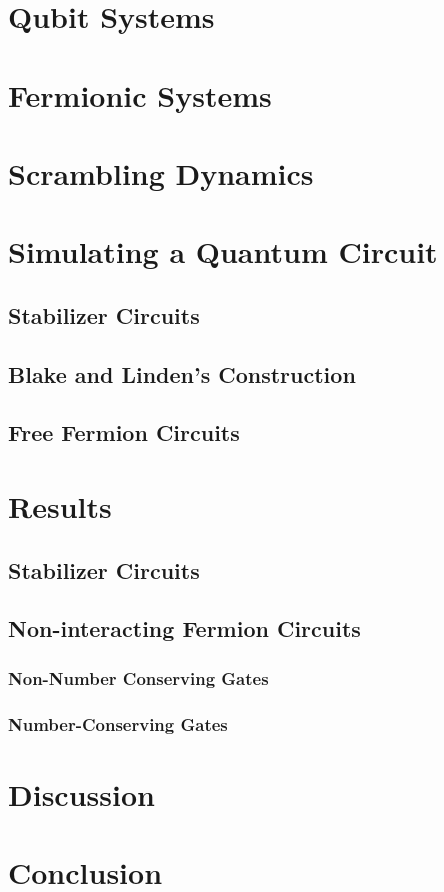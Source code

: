 \documentclass[ aps]{revtex4-2}
\begin{document}




\cleardoublepage





\section{Qubit Systems}




\section{Fermionic Systems}

\section{Scrambling Dynamics}

% 

\newpage
\section{Simulating a Quantum Circuit}
\subsection{Stabilizer Circuits}
\subsection{Blake and Linden's Construction}
\subsection{Free Fermion Circuits}

\section{Results}
\subsection{Stabilizer Circuits}
\subsection{Non-interacting Fermion Circuits}
\subsubsection{Non-Number Conserving Gates}
\subsubsection{Number-Conserving Gates}

\section{Discussion}

\section{Conclusion}





\end{document}
